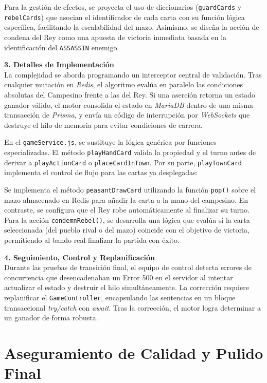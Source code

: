 Para la gestión de efectos, se proyecta el uso de diccionarios (\texttt{guardCards} y \texttt{rebelCards}) que asocian el identificador de cada carta con su función lógica específica, facilitando la escalabilidad del mazo. Asimismo, se diseña la acción de condena del Rey como una apuesta de victoria inmediata basada en la identificación del \texttt{ASSASSIN} enemigo.

\textbf{3. Detalles de Implementación} \\
La complejidad se aborda programando un interceptor central de validación. Tras cualquier mutación en \textit{Redis}, el algoritmo evalúa en paralelo las condiciones absolutas del Campesino frente a las del Rey. Si una aserción retorna un estado ganador válido, el motor consolida el estado en \textit{MariaDB} dentro de una misma transacción de \textit{Prisma}, y envía un código de interrupción por \textit{WebSockets} que destruye el hilo de memoria para evitar condiciones de carrera.

En el \texttt{gameService.js}, se sustituye la lógica genérica por funciones especializadas. El método \texttt{playHandCard} valida la propiedad y el turno antes de derivar a \texttt{playActionCard} o \texttt{placeCardInTown}. Por su parte, \texttt{playTownCard} implementa el control de flujo para las cartas ya desplegadas:

Se implementa el método \texttt{peasantDrawCard} utilizando la función \texttt{pop()} sobre el mazo almacenado en Redis para añadir la carta a la mano del campesino. En contraste, se configura que el Rey robe automáticamente al finalizar su turno. Para la acción \texttt{condemnRebel()}, se desarrolla una lógica que evalúa si la carta seleccionada (del pueblo rival o del mazo) coincide con el objetivo de victoria, permitiendo al bando real finalizar la partida con éxito.

\textbf{4. Seguimiento, Control y Replanificación} \\
Durante las pruebas de transición final, el equipo de control detecta errores de concurrencia que desencadenaban un Error 500 en el servidor al intentar actualizar el estado y destruir el hilo simultáneamente. La corrección requiere replanificar el \texttt{GameController}, encapsulando las sentencias en un bloque transaccional \textit{try/catch} con \textit{await}. Tras la corrección, el motor logra determinar a un ganador de forma robusta.

\section{Aseguramiento de Calidad y Pulido Final}

